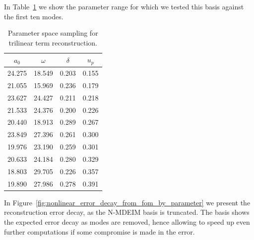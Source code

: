 \documentclass[../../thesis.tex]{subfiles}
\begin{document}
In Table~\ref{tab:mdeim_certification} we show the parameter range for which
we tested this basis against the first ten modes.
\begin{table}[h]
    \centering
    \caption{Parameter space sampling for trilinear term reconstruction.}
    \label{tab:mdeim_certification}
    \begin{tabular}{cccc}
        \toprule
        $a_0$  & $\omega$ & $\delta$ & $u_p$ \\
        \midrule
        24.275 &  18.549  & 0.203 &  0.155 \\
        21.055 &  15.969  & 0.236 &  0.179 \\
        23.627 &  24.427  & 0.211 &  0.218 \\
        21.533 &  24.376  & 0.200 &  0.226 \\
        20.440 &  18.913  & 0.289 &  0.267 \\
        23.849 &  27.396  & 0.261 &  0.300 \\
        19.976 &  23.190  & 0.259 &  0.301 \\
        20.633 &  24.184  & 0.280 &  0.329 \\
        18.803 &  29.705  & 0.226 &  0.357 \\
        19.890 &  27.986  & 0.278 &  0.391 \\
        \bottomrule
\end{tabular}
\end{table}
In Figure~\ref{fig:nonlinear_error_decay_from_fom_by_parameter} 
we present the reconstruction error decay, as the N-MDEIM basis is truncated.
The basis shows the expected error decay as modes are removed,
hence allowing to speed up even further computations 
if some compromise is made in the error.
\end{document}
